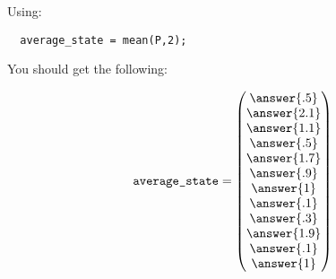 \documentclass{ximera}
\begin{document}
\begin{exploration}
\begin{example}
\begin{solution}
\begin{enumerate}
Using:

\begin{verbatim}
  average_state = mean(P,2);
\end{verbatim}

You should get the following:

\[
\texttt{average\_state} = \begin{pmatrix}
  \answer{.5}\\
  \answer{2.1}\\
  \answer{1.1}\\
  \answer{.5}\\
  \answer{1.7}\\
  \answer{.9}\\
  \answer{1}\\
  \answer{.1}\\
  \answer{.3}\\
  \answer{1.9}\\
  \answer{.1}\\
  \answer{1}
\end{pmatrix}
\]


  \end{enumerate}
\end{solution}
\end{example}

\end{exploration}
\end{document}
